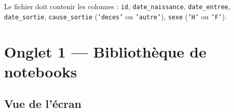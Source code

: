\documentclass[11pt,a4paper]{article}
\begin{document}
\begin{infobox}
Le fichier doit contenir les colonnes :
\texttt{id}, \texttt{date\_naissance}, \texttt{date\_entree}, \texttt{date\_sortie},
\texttt{cause\_sortie} (\texttt{'deces'} ou \texttt{'autre'}), \texttt{sexe} (\texttt{'H'} ou \texttt{'F'}).
\end{infobox}

\section{Onglet 1 — Bibliothèque de notebooks}

\subsection{Vue de l'écran}
\end{document}
